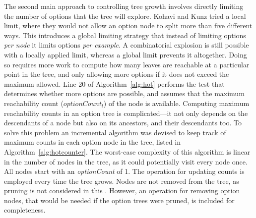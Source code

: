 The second main approach to controlling tree growth involves directly limiting the number of options that the tree will explore. Kohavi and Kunz tried a local limit, where they would not allow an option node to split more than five different ways. This \thesis  introduces a global limiting strategy that instead of limiting options {\em per node} it limits options {\em per example}.  
A combinatorial explosion is still possible with a locally applied limit, whereas a global limit prevents it altogether.
Doing so requires more work to compute how many leaves are reachable at a particular point in the tree, and only allowing more options if it does not exceed the maximum allowed. Line 20 of Algorithm~\ref{alg:hot} performs the test that determines whether more options are possible, and assumes that the maximum reachability count ($optionCount_{l}$) of the node is available. Computing maximum reachability counts in an option tree is complicated---it not only depends on the descendants of a node but also on its ancestors, and their descendants too. To solve this problem an incremental algorithm was devised to keep track of maximum counts in each option node in the tree, listed in Algorithm~\ref{alg:hotcounter}. The worst-case complexity of this algorithm is linear in the number of nodes in the tree, as it could potentially visit every node once. All nodes start with an {\em optionCount} of 1. The operation for updating counts is employed every time the tree grows. 
Nodes are not removed from the tree, as pruning is not considered in this  \thesisc. However, an operation for removing option nodes, that would be needed if the option trees were pruned, is included for completeness.

